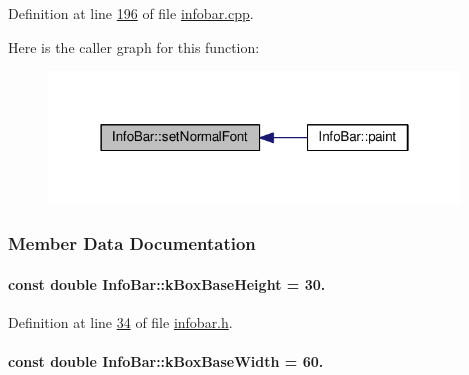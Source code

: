 Definition at line \hyperlink{infobar_8cpp_source_l00196}{196} of file \hyperlink{infobar_8cpp_source}{infobar.\+cpp}.



Here is the caller graph for this function\+:
\nopagebreak
\begin{figure}[H]
\begin{center}
\leavevmode
\includegraphics[width=310pt]{class_info_bar_a2bfda27ec3d1ae6b4b1c927876f594c1_icgraph}
\end{center}
\end{figure}




\subsubsection{Member Data Documentation}
\hypertarget{class_info_bar_a0f2f7b614000ae1d317ec3819acabbf2}{}
\paragraph[{k\+Box\+Base\+Height}]{\setlength{\rightskip}{0pt plus 5cm}const double Info\+Bar\+::k\+Box\+Base\+Height = 30.\hspace{0.3cm}{\ttfamily [static]}}\label{class_info_bar_a0f2f7b614000ae1d317ec3819acabbf2}


Definition at line \hyperlink{infobar_8h_source_l00034}{34} of file \hyperlink{infobar_8h_source}{infobar.\+h}.

\hypertarget{class_info_bar_a3eb5cc879199e1a927ed76eb989c4c0e}{}
\paragraph[{k\+Box\+Base\+Width}]{\setlength{\rightskip}{0pt plus 5cm}const double Info\+Bar\+::k\+Box\+Base\+Width = 60.\hspace{0.3cm}{\ttfamily [static]}}\label{class_info_bar_a3eb5cc879199e1a927ed76eb989c4c0e}



